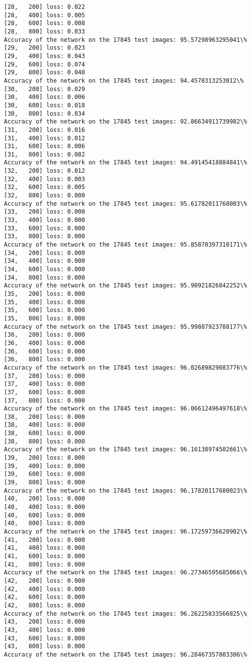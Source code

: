 \documentclass[11pt]{article}
\begin{document}
\begin{Verbatim}[commandchars=\\\{\}]
[28,   200] loss: 0.022
[28,   400] loss: 0.005
[28,   600] loss: 0.008
[28,   800] loss: 0.033
Accuracy of the network on the 17845 test images: 95.57298963295041\%
[29,   200] loss: 0.023
[29,   400] loss: 0.043
[29,   600] loss: 0.074
[29,   800] loss: 0.040
Accuracy of the network on the 17845 test images: 94.4578313253012\%
[30,   200] loss: 0.029
[30,   400] loss: 0.006
[30,   600] loss: 0.018
[30,   800] loss: 0.034
Accuracy of the network on the 17845 test images: 92.86634911739982\%
[31,   200] loss: 0.016
[31,   400] loss: 0.012
[31,   600] loss: 0.006
[31,   800] loss: 0.082
Accuracy of the network on the 17845 test images: 94.49145418884841\%
[32,   200] loss: 0.012
[32,   400] loss: 0.003
[32,   600] loss: 0.005
[32,   800] loss: 0.000
Accuracy of the network on the 17845 test images: 95.61782011768003\%
[33,   200] loss: 0.000
[33,   400] loss: 0.000
[33,   600] loss: 0.000
[33,   800] loss: 0.000
Accuracy of the network on the 17845 test images: 95.85878397310171\%
[34,   200] loss: 0.000
[34,   400] loss: 0.000
[34,   600] loss: 0.000
[34,   800] loss: 0.000
Accuracy of the network on the 17845 test images: 95.90921826842252\%
[35,   200] loss: 0.000
[35,   400] loss: 0.000
[35,   600] loss: 0.000
[35,   800] loss: 0.000
Accuracy of the network on the 17845 test images: 95.99887923788177\%
[36,   200] loss: 0.000
[36,   400] loss: 0.000
[36,   600] loss: 0.000
[36,   800] loss: 0.000
Accuracy of the network on the 17845 test images: 96.02689829083776\%
[37,   200] loss: 0.000
[37,   400] loss: 0.000
[37,   600] loss: 0.000
[37,   800] loss: 0.000
Accuracy of the network on the 17845 test images: 96.06612496497618\%
[38,   200] loss: 0.000
[38,   400] loss: 0.000
[38,   600] loss: 0.000
[38,   800] loss: 0.000
Accuracy of the network on the 17845 test images: 96.16138974502661\%
[39,   200] loss: 0.000
[39,   400] loss: 0.000
[39,   600] loss: 0.000
[39,   800] loss: 0.000
Accuracy of the network on the 17845 test images: 96.17820117680023\%
[40,   200] loss: 0.000
[40,   400] loss: 0.000
[40,   600] loss: 0.000
[40,   800] loss: 0.000
Accuracy of the network on the 17845 test images: 96.17259736620902\%
[41,   200] loss: 0.000
[41,   400] loss: 0.000
[41,   600] loss: 0.000
[41,   800] loss: 0.000
Accuracy of the network on the 17845 test images: 96.27346595685066\%
[42,   200] loss: 0.000
[42,   400] loss: 0.000
[42,   600] loss: 0.000
[42,   800] loss: 0.000
Accuracy of the network on the 17845 test images: 96.26225833566825\%
[43,   200] loss: 0.000
[43,   400] loss: 0.000
[43,   600] loss: 0.000
[43,   800] loss: 0.000
Accuracy of the network on the 17845 test images: 96.28467357803306\%

\end{Verbatim}
\end{document}

